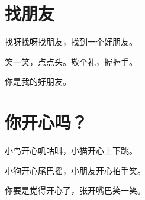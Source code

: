 \documentclass[12pt,UTF-8,openany]{ctexbook}
\begin{document}
\hanzibox{}\hanzibox{}\hanzibox{}\hanzibox{}\hspace{1em}\hanzibox{}\hanzibox{}\hanzibox{}\hanzibox{}






\chapter{找朋友}

\begin{large}
    
    找呀找呀找朋友，找到一个好朋友。
    
    笑一笑，点点头。敬个礼，握握手。
    
    你是我的好朋友。
    
\end{large}


\clearpage

\begin{center}
    
\end{center}


\hanzibox{}\hanzibox{}\hanzibox{}\hanzibox{}\hspace{1em}\hanzibox{}\hanzibox{}\hanzibox{}\hanzibox{}

\hanzibox{}\hanzibox{}\hanzibox{}\hanzibox{}\hspace{1em}\hanzibox{}\hanzibox{}\hanzibox{}\hanzibox{}

\hanzibox{}\hanzibox{}\hanzibox{}\hanzibox{}\hspace{1em}\hanzibox{}\hanzibox{}\hanzibox{}\hanzibox{}






\chapter{你开心吗？}

\begin{large}
    
    小鸟开心叽咕叫，小猫开心上下跳。
    
    小狗开心尾巴摇，小朋友开心拍手笑。
    
    你要是觉得开心了，张开嘴巴笑一笑。
    
\end{large}
\end{document}
